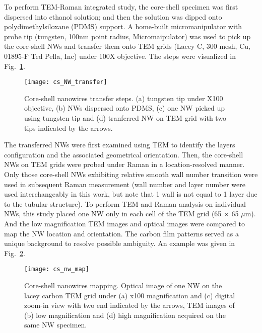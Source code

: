 To perform TEM-Raman integrated study, the core-shell specimen was first dispersed into ethanol solution; and then the solution was dipped onto polydimethylsiloxane (PDMS) support. A home-built micromanipulator with probe tip (tungsten, 100nm point radius, Micromaipulator) was used to pick up the core-shell NWs and transfer them onto TEM grids (Lacey C, 300 mesh, Cu, 01895-F Ted Pella, Inc) under 100X objective. The steps were visualized in Fig.~\ref{fig:ch5ws2trans}. 
\begin{figure}[htb]
\centering
\texttt{[image: cs\_NW\_transfer]}
\caption[Core-shell nanowires transfer steps]{Core-shell nanowires transfer steps. (a) tungsten tip under X100 objective, (b) NWs dispersed onto PDMS, (c) one NW picked up using tungsten tip and (d) tranferred NW on TEM grid with two tips indicated by the arrows.}
\label{fig:ch5ws2trans}
\end{figure}
The transferred NWs were first examined using TEM to identify the  layers configuration and the associated geometrical orientation. Then, the core-shell NWs on TEM grids were probed under Raman in a location-resolved manner. Only those core-shell NWs exhibiting relative smooth  wall number transition were used in subsequent Raman measurement (wall number and layer number were used interchangeably in this work, but note that 1 wall is not equal to 1 layer due to the tubular structure). To perform TEM and Raman analysis on individual NWs, this study placed one NW only in each cell of the TEM grid (65 $\times$ 65 $\mu$m). And the low magnification TEM images and optical images were compared to map the NW location and orientation. The carbon film patterns served as a unique background to resolve possible ambiguity. An example was given in Fig.~\ref{fig:ch5ws2map}. 
\begin{figure}[htb]
\centering
\texttt{[image: cs\_nw\_map]}
\caption[Core-shell nanowires mapping]{Core-shell nanowires mapping. Optical image of one NW on the lacey  carbon TEM grid under (a) x100 magnification and (c) digital zoom-in view with two end indicated by the arrows, TEM images of (b) low magnification and (d) high magnification acquired on the same NW specimen.}
\label{fig:ch5ws2map}
\end{figure}

